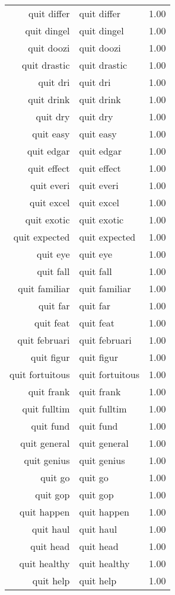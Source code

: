 \begin{table}[ht]
\begin{tabular}{rlr}
  quit differ & quit differ & 1.00 \\ 
  quit dingel & quit dingel & 1.00 \\ 
  quit doozi & quit doozi & 1.00 \\ 
  quit drastic & quit drastic & 1.00 \\ 
  quit dri & quit dri & 1.00 \\ 
  quit drink & quit drink & 1.00 \\ 
  quit dry & quit dry & 1.00 \\ 
  quit easy & quit easy & 1.00 \\ 
  quit edgar & quit edgar & 1.00 \\ 
  quit effect & quit effect & 1.00 \\ 
  quit everi & quit everi & 1.00 \\ 
  quit excel & quit excel & 1.00 \\ 
  quit exotic & quit exotic & 1.00 \\ 
  quit expected & quit expected & 1.00 \\ 
  quit eye & quit eye & 1.00 \\ 
  quit fall & quit fall & 1.00 \\ 
  quit familiar & quit familiar & 1.00 \\ 
  quit far & quit far & 1.00 \\ 
  quit feat & quit feat & 1.00 \\ 
  quit februari & quit februari & 1.00 \\ 
  quit figur & quit figur & 1.00 \\ 
  quit fortuitous & quit fortuitous & 1.00 \\ 
  quit frank & quit frank & 1.00 \\ 
  quit fulltim & quit fulltim & 1.00 \\ 
  quit fund & quit fund & 1.00 \\ 
  quit general & quit general & 1.00 \\ 
  quit genius & quit genius & 1.00 \\ 
  quit go & quit go & 1.00 \\ 
  quit gop & quit gop & 1.00 \\ 
  quit happen & quit happen & 1.00 \\ 
  quit haul & quit haul & 1.00 \\ 
  quit head & quit head & 1.00 \\ 
  quit healthy & quit healthy & 1.00 \\ 
  quit help & quit help & 1.00 \\ 

\end{tabular}
\end{table}
